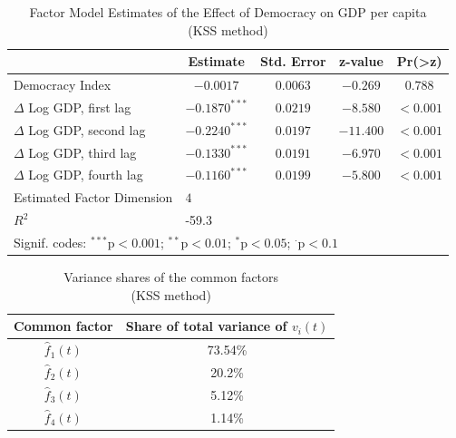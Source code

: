 \begin{appendix}
\begin{table}[htb]
\centering
\captionsetup{justification=centering}
\caption{Factor Model Estimates of the Effect of Democracy on GDP per capita \\
(\acs{KSS} method) } \label{kss_results_a1}
\begin{tabular}{lcccc}
\hline
& Estimate & Std. Error & z-value & Pr(>z) \\
\hline
Democracy Index & $-0.0017$ & $0.0063$ & $-0.269$ & $0.788$ \\
$\Delta$ Log GDP, first lag & $-0.1870^{***}$ & $0.0219$ & $-8.580$ & $<0.001$ \\
$\Delta$ Log GDP, second lag & $-0.2240^{***}$ & $0.0197$ & $-11.400$ & $<0.001$ \\
$\Delta$ Log GDP, third lag & $-0.1330^{***}$ & $0.0191$ & $-6.970$ & $<0.001$ \\
$\Delta$ Log GDP, fourth lag & $-0.1160^{***}$ & $0.0199$ & $-5.800$ & $<0.001$ \\
\hline
Estimated Factor Dimension & \multicolumn{4}{l}{$4$} \\
\( R^2 \) & \multicolumn{4}{l}{-59.3} \\
\hline
\multicolumn{5}{l}{Signif. codes: $^{***}$p$<0.001$; $^{**}$p$<0.01$; $^{*}$p$<0.05$; $^{\cdot}$p$<0.1$}\\
\end{tabular}
\end{table}


\begin{table}[]
  \caption{Variance shares of the common factors \\
  (\acs{KSS} method)}
  \centering
  \begin{tabular}{cc}
    \hline 
    Common factor & Share of total variance of \( v_i(t) \) \\
    \hline 
    \( \hat{f}_1(t) \) & 73.54\% \\
    \( \hat{f}_2(t) \) & 20.2\% \\
    \( \hat{f}_3(t) \) & 5.12\% \\
    \( \hat{f}_4(t) \) & 1.14\% \\
    \hline
  \end{tabular}
  \label{tab:variance_appendix}
\end{table}



\end{appendix}
